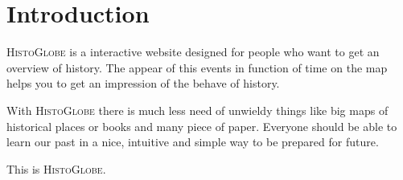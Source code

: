 \section{Introduction}

\textsc{HistoGlobe} is a interactive website designed for people who want to get an overview of history. The appear of this events in function of time on the map helps you to get an impression of the behave of history.

With \textsc{HistoGlobe} there is much less need of unwieldy things like big maps of historical places or books and many piece of paper. Everyone should be able to learn our past in a nice, intuitive and simple way to be prepared for future.

This is \textsc{HistoGlobe}.

